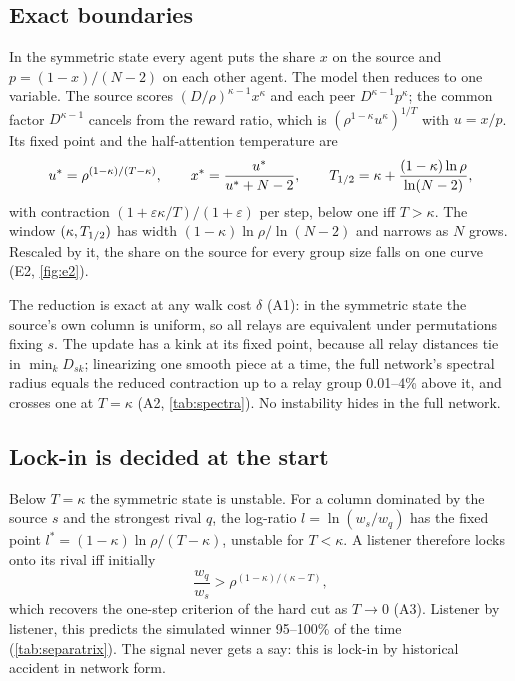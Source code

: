 \subsection{Exact boundaries}\label{sec:boundaries}
In the symmetric state every agent puts the share $x$ on the source and $p=(1-x)/(N-2)$ on each other agent. The model
then reduces to one variable. The source scores $(D/\rho)^{\kappa-1}x^\kappa$ and each peer $D^{\kappa-1}p^\kappa$; the
common factor $D^{\kappa-1}$ cancels from the reward ratio, which is $(\rho^{1-\kappa}u^\kappa)^{1/T}$ with $u=x/p$.
Its fixed point and the half-attention temperature are
\begin{equation}
  u^*=\rho^{(1-\kappa)/(T-\kappa)},\qquad x^*=\frac{u^*}{u^*+N-2},\qquad
  T_{1/2}=\kappa+\frac{(1-\kappa)\ln\rho}{\ln(N-2)},
\end{equation}
with contraction $(1+\varepsilon\kappa/T)/(1+\varepsilon)$ per step, below one iff $T>\kappa$. The window
$(\kappa,T_{1/2})$ has width $(1-\kappa)\ln\rho/\ln(N-2)$ and narrows as $N$ grows. Rescaled by it, the share on the
source for every group size falls on one curve (E2, \cref{fig:e2}).

The reduction is exact at any walk cost $\delta$ (A1): in the symmetric state the source's own column is uniform, so all
relays are equivalent under permutations fixing $s$. The update has a kink at its fixed point, because all relay
distances tie in $\min_k D_{sk}$; linearizing one smooth piece at a time, the full network's spectral radius equals the
reduced contraction up to a relay group 0.01--4\% above it, and crosses one at $T=\kappa$ (A2, \cref{tab:spectra}). No
instability hides in the full network.


\begin{table}[tbp]\centering\small
\caption{Linearization of the anchored piece at the symmetric state, $N=10$, $\kappa=0.3$, $\varepsilon=1$ (A2). For
$T<\kappa$ the unstable interior point is used.}\label{tab:spectra}

\end{table}

\subsection{Lock-in is decided at the start}\label{sec:separatrix}
Below $T=\kappa$ the symmetric state is unstable. For a column dominated by the source $s$ and the strongest rival $q$,
the log-ratio $l=\ln(w_s/w_q)$ has the fixed point $l^*=(1-\kappa)\ln\rho/(T-\kappa)$, unstable for $T<\kappa$. A listener
therefore locks onto its rival iff initially
\begin{equation}
  \frac{w_q}{w_s}>\rho^{(1-\kappa)/(\kappa-T)},
\end{equation}
which recovers the one-step criterion of the hard cut as $T\to0$ (A3). Listener by listener, this predicts the simulated
winner 95--100\% of the time (\cref{tab:separatrix}). The signal never gets a say: this is lock-in by historical accident
\citep{arthur1989competing} in network form.

